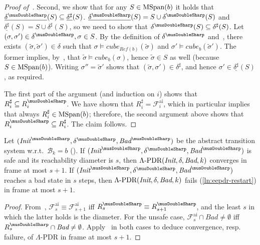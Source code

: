 \documentclass[acmsmall,screen]{acmart}
\newcommand{\Init}{{\textit{Init}}}
\newcommand{\Bad}{\textit{Bad}}
\newcommand{\tr}{\delta}
\newcommand{\Frameai}{\mathcal{F}^{\text{ai}}}
\newcommand{\reflextr}[1]{\underline{#1}}
\newcommand{\postimage}[2]{{\reflextr{#1}}({#2})}
\newcommand{\bkwrch}[1]{\mathcal{B}_{#1}}
\newcommand{\cubemon}[2]{\textit{cube}_{{#2}}({#1})}
\newcommand{\moncube}[2]{\cubemon{#1}{#2}}
\newcommand{\mspan}[1]{{\rm MSpan}({#1})}
\newcommand{\abs}[1]{{#1}^{\sharp}}
\newcommand{\absr}[1]{{#1}^{\musDoubleSharp}}
\newcommand{\eepdr}{\Lambda\mbox{\rm-PDR}}
\newcommand{\bkcube}{b}
\newcommand{\reflect}[1]{\textit{Ref}({#1})}
\begin{document}
\begin{proof}[Proof of~]
Second, we show that for any $S \in \mspan{\bkcube}$ it holds that $\postimage{\absr{\tr}}{S} \subseteq \postimage{\abs{\tr}}{S}$.
$\postimage{\absr{\tr}}{S} = S \cup \absr{\tr}(S)$ and $\postimage{\abs{\tr}}{S} = S \cup \abs{\tr}(S)$, so we need to show that $\absr{\tr}(S) \subseteq \abs{\tr}(S)$.
Let $(\sigma,\sigma') \in \absr{\tr}, \sigma \in S$. By the definition of $\absr{\tr}$ and~, there exists $(\widetilde{\sigma},\widetilde{\sigma}') \in \tr$ such that $\sigma \models \moncube{\widetilde{\sigma}}{\reflect{\bkcube}}$ and $\sigma' \models \moncube{\widetilde{\sigma}'}{\bkcube}$.
The former implies, by~, that $\widetilde{\sigma} \models \moncube{\sigma}{\bkcube}$, hence $\widetilde{\sigma} \in S$ as well (because $S \in \mspan{\bkcube}$). Writing $\sigma'' = \widetilde{\sigma}'$ shows that $(\widetilde{\sigma},\sigma') \in \abs{\tr}$, and hence $\sigma' \in \postimage{\abs{\tr}}{S}$, as required.

The first part of the argument (and induction on $i$) shows that $\abs{R}_i \subseteq \absr{R}_i$.
We have shown that $\abs{R}_i = \Frameai_i$, which in particular implies that
%
always $\abs{R}_i \in \mspan{\bkcube}$; therefore, the second argument above shows that $\absr{R}_i \subseteq \abs{R}_i$.
The claim follows.
\end{proof}
\begin{corollary}
\label{thm:abstract-diameter-eepdr}
%
%
Let $(\absr{\Init},\absr{\tr},\absr{\Bad})$ be the abstract transition system w.r.t.\ $\bkwrch{k}=\bkcube$ ().
If $(\absr{\Init},\absr{\tr},\absr{\Bad})$ is safe and its reachability diameter is $s$, then
$\eepdr(\Init,\tr,\Bad,k)$ converges in frame at most $s+1$.
If $(\absr{\Init},\absr{\tr},\absr{\Bad})$ reaches a bad state in $s$ steps, then $\eepdr(\Init,\tr,\Bad,k)$ fails (\cref{ln:eepdr-restart}) in frame at most $s+1$.
%
%
%
%
\end{corollary}
\begin{proof}
From~, $\Frameai_{s} \equiv \Frameai_{s+1}$ iff $\absr{R}_{s} \equiv \absr{R}_{s+1}$, %
and the least $s$ in which the latter holds is the diameter. For the unsafe case, $\Frameai_s \cap \Bad \neq \emptyset$ iff $\absr{R}_s \cap \Bad \neq \emptyset$. Apply~ in both cases to deduce convergence, resp. failure, of $\Lambda$-PDR in frame at most $s+1$.
\end{proof}

%
%
%
%
%
%
%
%
%
%
%
%
%
%
%
%
\end{document}
